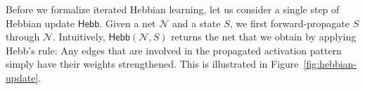 \documentclass[letterpaper]{article}
\theoremstyle{definition}
\newcommand{\State}{\mathsf{State}}
\newcommand{\AllNets}{\mathsf{Net}}
\newcommand{\Net}{\mathcal{N}}
\newcommand{\Hebb}[2]{\mathsf{Hebb}(#1, #2)}
\newcommand{\HebbNoArgs}{\mathsf{Hebb}}
\newcommand{\HebbstarNoArgs}{\mathsf{Hebb}^*}
\begin{document}
Before we formalize iterated Hebbian learning, let us consider a single step of Hebbian update $\HebbNoArgs$.  Given a net $\Net$ and a state $S$, we first forward-propagate $S$ through $\Net$.  Intuitively, $\Hebb{\Net}{S}$ returns the net that we obtain by applying Hebb's rule: Any edges that are involved in the propagated activation pattern simply have their weights strengthened.  This is illustrated in Figure~\ref{fig:hebbian-update}.

\end{document}
